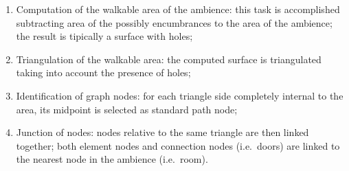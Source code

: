 \begin{enumerate}
\def\labelenumi{\arabic{enumi}.}
\itemsep1pt\parskip0pt
\item
 Computation of the walkable area of the ambience: this task is
 accomplished subtracting area of the possibly encumbrances to the area
 of the ambience; the result is tipically a surface with holes;
\item
 Triangulation of the walkable area: the computed surface is
 triangulated taking into account the presence of holes;
\item
 Identification of graph nodes: for each triangle side completely
 internal to the area, its midpoint is selected as standard path node;
\item
 Junction of nodes: nodes relative to the same triangle are then linked
 together; both element nodes and connection nodes (i.e.~doors) are
 linked to the nearest node in the ambience (i.e.~room).
\end{enumerate}

